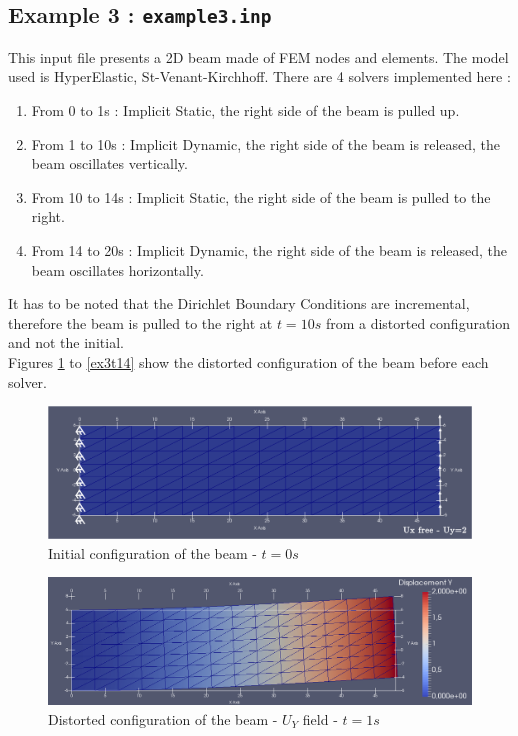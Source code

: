 \documentclass[oneside,11pt,times]{book}
\begin{document}
\newpage
\subsection{Example 3 : \texttt{example3.inp}}
This input file presents a 2D beam made of FEM nodes and elements. The model used is HyperElastic, St-Venant-Kirchhoff. There are 4 solvers implemented here :
\begin{enumerate}
    \item From 0 to 1s : Implicit Static, the right side of the beam is pulled up.
    \item From 1 to 10s : Implicit Dynamic, the right side of the beam is released, the beam oscillates vertically.
    \item From 10 to 14s : Implicit Static, the right side of the beam is pulled to the right.
    \item From 14 to 20s : Implicit Dynamic, the right side of the beam is released, the beam oscillates horizontally.
\end{enumerate}
It has to be noted that the Dirichlet Boundary Conditions are incremental, therefore the beam is pulled to the right at $t=10s$ from a distorted configuration and not the initial.\\
Figures \ref{ex3t0} to \ref{ex3t14} show the distorted configuration of the beam before each solver.

\begin{figure}[h!]
    \centering
    \includegraphics[scale=0.19]{imgs/Examples/ex3t0.png}
    \caption{Initial configuration of the beam  -  $t=0s$}
    \label{ex3t0}
\end{figure}

\begin{figure}[h!]
    \centering
    \includegraphics[scale=0.35]{imgs/Examples/ex3t1.png}
    \caption{Distorted configuration of the beam  -  $U_{Y}$ field  -  $t=1s$}
    \label{ex3t1}
\end{figure}
\end{document}
